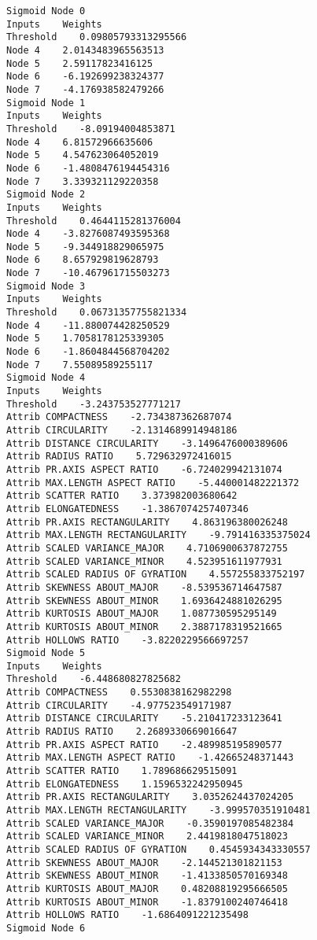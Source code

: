 \documentclass[
	article,			%
	11pt,				%
	oneside,			%
	a4paper,			%
	english,			%
	brazil,				%
	sumario=tradicional
	]{abntex2}
\begin{document}
\begin{lstlisting}
Sigmoid Node 0
Inputs    Weights
Threshold    0.09805793313295566
Node 4    2.0143483965563513
Node 5    2.59117823416125
Node 6    -6.192699238324377
Node 7    -4.176938582479266
Sigmoid Node 1
Inputs    Weights
Threshold    -8.09194004853871
Node 4    6.81572966635606
Node 5    4.547623064052019
Node 6    -1.4808476194454316
Node 7    3.339321129220358
Sigmoid Node 2
Inputs    Weights
Threshold    0.4644115281376004
Node 4    -3.8276087493595368
Node 5    -9.344918829065975
Node 6    8.657929819628793
Node 7    -10.467961715503273
Sigmoid Node 3
Inputs    Weights
Threshold    0.06731357755821334
Node 4    -11.880074428250529
Node 5    1.7058178125339305
Node 6    -1.8604844568704202
Node 7    7.55089589255117
Sigmoid Node 4
Inputs    Weights
Threshold    -3.243753527771217
Attrib COMPACTNESS    -2.734387362687074
Attrib CIRCULARITY    -2.1314689914948186
Attrib DISTANCE CIRCULARITY    -3.1496476000389606
Attrib RADIUS RATIO    5.729632972416015
Attrib PR.AXIS ASPECT RATIO    -6.724029942131074
Attrib MAX.LENGTH ASPECT RATIO    -5.440001482221372
Attrib SCATTER RATIO    3.373982003680642
Attrib ELONGATEDNESS    -1.3867074257407346
Attrib PR.AXIS RECTANGULARITY    4.863196380026248
Attrib MAX.LENGTH RECTANGULARITY    -9.791416335375024
Attrib SCALED VARIANCE_MAJOR    4.7106900637872755
Attrib SCALED VARIANCE_MINOR    4.523951611977931
Attrib SCALED RADIUS OF GYRATION    4.557255833752197
Attrib SKEWNESS ABOUT_MAJOR    -8.539536714647587
Attrib SKEWNESS ABOUT_MINOR    1.6936424881026295
Attrib KURTOSIS ABOUT_MAJOR    1.087730595295149
Attrib KURTOSIS ABOUT_MINOR    2.3887178319521665
Attrib HOLLOWS RATIO    -3.8220229566697257
Sigmoid Node 5
Inputs    Weights
Threshold    -6.448680827825682
Attrib COMPACTNESS    0.5530838162982298
Attrib CIRCULARITY    -4.977523549171987
Attrib DISTANCE CIRCULARITY    -5.210417233123641
Attrib RADIUS RATIO    2.2689330669016647
Attrib PR.AXIS ASPECT RATIO    -2.489985195890577
Attrib MAX.LENGTH ASPECT RATIO    -1.42665248371443
Attrib SCATTER RATIO    1.789686629515091
Attrib ELONGATEDNESS    1.1596532242950945
Attrib PR.AXIS RECTANGULARITY    3.0352624437024205
Attrib MAX.LENGTH RECTANGULARITY    -3.999570351910481
Attrib SCALED VARIANCE_MAJOR    -0.3590197085482384
Attrib SCALED VARIANCE_MINOR    2.4419818047518023
Attrib SCALED RADIUS OF GYRATION    0.4545934343330557
Attrib SKEWNESS ABOUT_MAJOR    -2.144521301821153
Attrib SKEWNESS ABOUT_MINOR    -1.4133850570169348
Attrib KURTOSIS ABOUT_MAJOR    0.48208819295666505
Attrib KURTOSIS ABOUT_MINOR    -1.8379100240746418
Attrib HOLLOWS RATIO    -1.6864091221235498
Sigmoid Node 6

\end{lstlisting}
\end{document}
